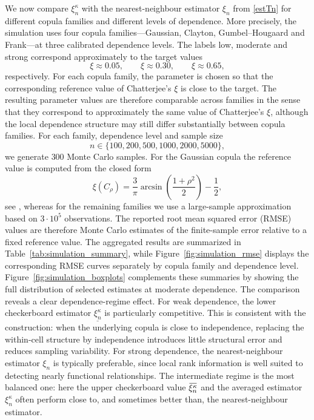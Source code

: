 \documentclass{article}
\theoremstyle{definition}
\newcommand{\overbar}[1]{\mkern 1.5mu\overline{\mkern-1.5mu#1\mkern-1.5mu}\mkern 1.5mu}
\begin{document}
We now compare $\xi_n^\kappa$ with the nearest-neighbour estimator $\xi_n$ from \eqref{estTn} for different copula families and different levels of dependence.
More precisely, the simulation uses four copula families---Gaussian, Clayton,
Gumbel--Hougaard and Frank---at three calibrated dependence levels.  The labels
low, moderate and strong correspond approximately to the target values
\[
    \xi \approx 0.05,\qquad
    \xi \approx 0.30,\qquad
    \xi \approx 0.65,
\]
respectively.  For each copula family, the parameter is chosen so that the corresponding reference value of Chatterjee's \(\xi\) is close to the target.
The resulting parameter values are therefore comparable across families in the sense that they correspond to approximately the same value of Chatterjee's \(\xi\), although the local dependence structure may still differ substantially between copula families.
For each family, dependence level and sample size
\[
    n\in\{100,200,500,1000,2000,5000\},
\]
we generate $300$ Monte Carlo samples.
For the Gaussian copula the reference value is computed from the closed form
\[
    \xi(C_\rho)
    =
    \frac{3}{\pi}
    \arcsin\!\left(\frac{1+\rho^2}{2}\right)
    -\frac12,
\]
see \cite[Ex.~4]{fuchs2024quantifying}, whereas for the remaining families we use a large-sample approximation based on $3\cdot 10^5$ observations.
The reported root mean squared error (RMSE) values are therefore Monte Carlo
estimates of the finite-sample error relative to a fixed reference value.
The aggregated results are summarized in Table~\ref{tab:simulation_summary},
while Figure~\ref{fig:simulation_rmse} displays the corresponding RMSE curves
separately by copula family and dependence level.
Figure~\ref{fig:simulation_boxplots} complements these summaries by showing the
full distribution of selected estimates at moderate dependence.
The comparison reveals a clear dependence-regime effect.
For weak dependence, the lower checkerboard estimator $\underline{\xi_n^\kappa}$ is particularly competitive.
This is consistent with the construction: when the underlying copula is close to independence, replacing the within-cell structure by independence introduces little structural error and reduces sampling variability.
For strong dependence, the nearest-neighbour estimator $\xi_n$ is typically preferable, since local rank information is well suited to detecting nearly functional relationships.
The intermediate regime is the most balanced one: here the upper checkerboard value $\overbar{\xi_n^\kappa}$ and the averaged estimator $\xi_n^\kappa$ often perform close to, and sometimes better than, the nearest-neighbour estimator.
\end{document}
